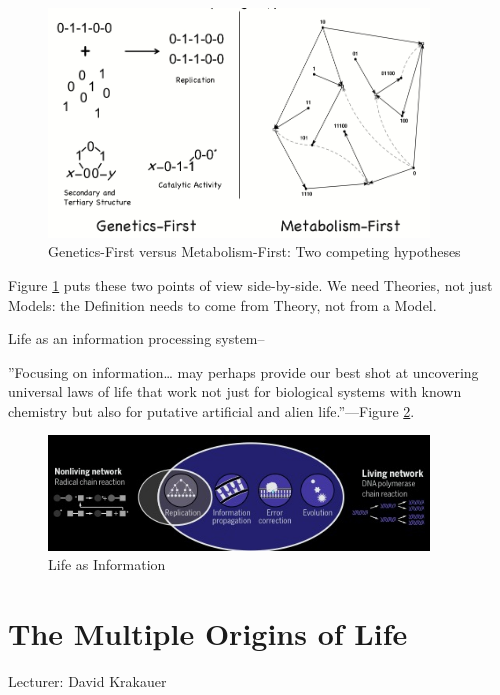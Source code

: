 \documentclass[]{article}
\begin{document}
\begin{figure}[H]
	\caption{Genetics-First versus Metabolism-First: Two competing hypotheses}\label{fig:GeneticsVsMetabolism}
	\includegraphics[width=0.9\textwidth]{GeneticsVsMetabolism}
\end{figure}

Figure \ref{fig:GeneticsVsMetabolism} puts these two points of view side-by-side. We need Theories, not just Models: the Definition needs to come from Theory, not from a Model.

Life as an information processing system--\cite{nurse2008life}

''Focusing on information… may perhaps provide our best shot at uncovering universal laws of life that work not just for biological systems with known chemistry but also for putative artificial and alien life.''--\cite{cronin2016beyond}--Figure \ref{fig:LifeInformation}.

\begin{figure}[H]
	\caption{Life as Information}\label{fig:LifeInformation}
	\includegraphics[width=0.9\textwidth]{LifeInformation}
\end{figure}


\section{The Multiple Origins of Life}

Lecturer: David Krakauer
\end{document}
